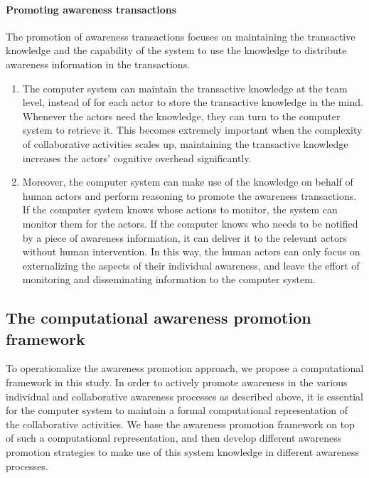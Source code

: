 \paragraph*{Promoting awareness transactions} %
\label{par:promoting_awareness_transactions}
The promotion of awareness transactions focuses on maintaining the transactive knowledge and the capability of the system to use the knowledge to distribute awareness information in the transactions. 
\begin{enumerate}
   \item The computer system can maintain the transactive knowledge at the team level, instead of for each actor to store the transactive knowledge in the mind. Whenever the actors need the knowledge, they can turn to the computer system to retrieve it. This becomes extremely important when the complexity of collaborative activities scales up, maintaining the transactive knowledge increases the actors' cognitive overhead significantly.
   \item Moreover, the computer system can make use of the knowledge on behalf of human actors and perform reasoning to promote the awareness transactions. If the computer system knows whose actions to monitor, the system can monitor them for the actors. If the computer knows who needs to be notified by a piece of awareness information, it can deliver it to the relevant actors without human intervention. In this way, the human actors can only focus on externalizing the aspects of their individual awareness, and leave the effort of monitoring and disseminating information to the computer system.
\end{enumerate}




\subsection{The computational awareness promotion framework} %
\label{sub:the_awareness_promotion_framework}
To operationalize the awareness promotion approach, we propose a computational framework in this study. In order to actively promote awareness in the various individual and collaborative awareness processes as described above, it is essential for the computer system to maintain a formal computational representation of the collaborative activities. We base the awareness promotion framework on top of such a computational representation, and then develop different awareness promotion strategies to make use of this system knowledge in different awareness processes. 

